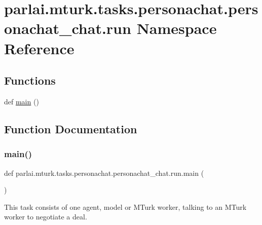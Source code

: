 \hypertarget{namespaceparlai_1_1mturk_1_1tasks_1_1personachat_1_1personachat__chat_1_1run}{}\section{parlai.\+mturk.\+tasks.\+personachat.\+personachat\+\_\+chat.\+run Namespace Reference}
\label{namespaceparlai_1_1mturk_1_1tasks_1_1personachat_1_1personachat__chat_1_1run}
\subsection*{Functions}
\begin{DoxyCompactItemize}
\item 
def \hyperlink{namespaceparlai_1_1mturk_1_1tasks_1_1personachat_1_1personachat__chat_1_1run_a1ba907ef6c5ac6a41561053ca22901d2}{main} ()
\end{DoxyCompactItemize}


\subsection{Function Documentation}
\mbox{\label{namespaceparlai_1_1mturk_1_1tasks_1_1personachat_1_1personachat__chat_1_1run_a1ba907ef6c5ac6a41561053ca22901d2}} 
\subsubsection{\texorpdfstring{main()}{main()}}
{\footnotesize\ttfamily def parlai.\+mturk.\+tasks.\+personachat.\+personachat\+\_\+chat.\+run.\+main (\begin{DoxyParamCaption}{ }\end{DoxyParamCaption})}

\begin{DoxyVerb}This task consists of one agent, model or MTurk worker, talking to an MTurk worker
to negotiate a deal.
\end{DoxyVerb}
 

